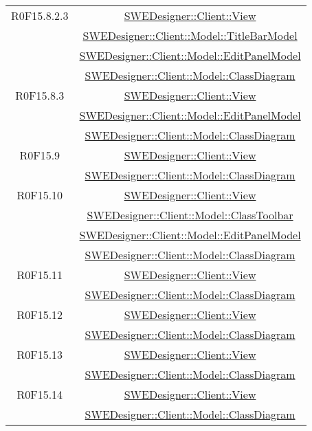 \documentclass[../SpecificaTecnica.tex]{subfiles}
\begin{document}
\begin{longtable}{|c|c|}
		R0F15.8.2.3 & \hyperlink{SWEDesigner::Client::View}{SWEDesigner::Client::View}\\& \hyperlink{SWEDesigner::Client::Model::TitleBarModel}{SWEDesigner::Client::Model::TitleBarModel}\\& \hyperlink{SWEDesigner::Client::Model::EditPanelModel}{SWEDesigner::Client::Model::EditPanelModel}\\& \hyperlink{SWEDesigner::Client::Model::ClassDiagram}{SWEDesigner::Client::Model::ClassDiagram}\\\hline
		R0F15.8.3 & \hyperlink{SWEDesigner::Client::View}{SWEDesigner::Client::View}\\& \hyperlink{SWEDesigner::Client::Model::EditPanelModel}{SWEDesigner::Client::Model::EditPanelModel}\\& \hyperlink{SWEDesigner::Client::Model::ClassDiagram}{SWEDesigner::Client::Model::ClassDiagram}\\\hline
		R0F15.9 & \hyperlink{SWEDesigner::Client::View}{SWEDesigner::Client::View}\\& \hyperlink{SWEDesigner::Client::Model::ClassDiagram}{SWEDesigner::Client::Model::ClassDiagram}\\\hline
		R0F15.10 & \hyperlink{SWEDesigner::Client::View}{SWEDesigner::Client::View}\\& \hyperlink{SWEDesigner::Client::Model::ClassToolbar}{SWEDesigner::Client::Model::ClassToolbar}\\& \hyperlink{SWEDesigner::Client::Model::EditPanelModel}{SWEDesigner::Client::Model::EditPanelModel}\\& \hyperlink{SWEDesigner::Client::Model::ClassDiagram}{SWEDesigner::Client::Model::ClassDiagram}\\\hline
		R0F15.11 & \hyperlink{SWEDesigner::Client::View}{SWEDesigner::Client::View}\\& \hyperlink{SWEDesigner::Client::Model::ClassDiagram}{SWEDesigner::Client::Model::ClassDiagram}\\\hline
		R0F15.12 & \hyperlink{SWEDesigner::Client::View}{SWEDesigner::Client::View}\\& \hyperlink{SWEDesigner::Client::Model::ClassDiagram}{SWEDesigner::Client::Model::ClassDiagram}\\\hline
		R0F15.13 & \hyperlink{SWEDesigner::Client::View}{SWEDesigner::Client::View}\\& \hyperlink{SWEDesigner::Client::Model::ClassDiagram}{SWEDesigner::Client::Model::ClassDiagram}\\\hline
		R0F15.14 & \hyperlink{SWEDesigner::Client::View}{SWEDesigner::Client::View}\\& \hyperlink{SWEDesigner::Client::Model::ClassDiagram}{SWEDesigner::Client::Model::ClassDiagram}\\\hline

\end{longtable}
\end{document}
